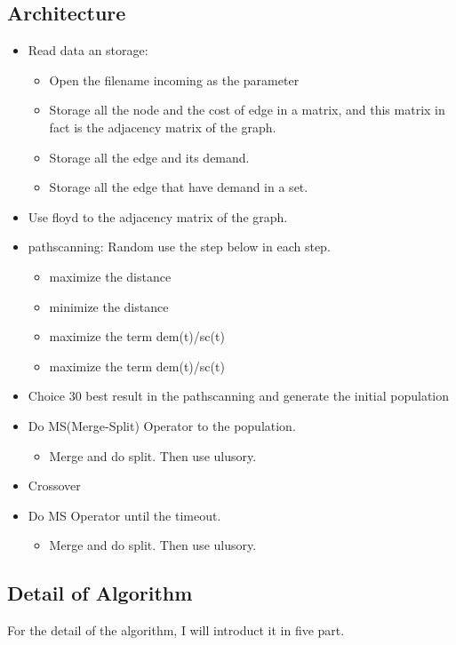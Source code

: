 \documentclass[conference,compsoc]{IEEEtran}
\begin{document}
  \subsection{Architecture}
    \begin{itemize}
      \item Read data an storage:
        \begin{itemize}
          \item Open the filename incoming as the parameter
          \item Storage all the node and the cost of edge in a matrix, and this matrix in fact is the adjacency matrix of the graph.
          \item Storage all the edge and its demand.
          \item Storage all the edge that have demand in a set.
        \end{itemize}
      \item Use floyd to the adjacency matrix of the graph.
      \item pathscanning: 
      Random use the step below in each step.
        \begin{itemize}
          \item maximize the distance
          \item minimize the distance 
          \item maximize the term dem(t)/sc(t)
          \item maximize the term dem(t)/sc(t)
        \end{itemize}
      \item Choice 30 best result in the pathscanning and generate the initial population
      \item Do MS(Merge-Split) Operator to the population.
        \begin{itemize}
          \item Merge and do split. Then use ulusory.
        \end{itemize}
      \item Crossover
      \item Do MS Operator until the timeout.
        \begin{itemize}
          \item Merge and do split. Then use ulusory.
        \end{itemize}
    \end{itemize}
  \subsection{Detail of Algorithm}
For the detail of the algorithm, I will introduct it in five part.
\end{document}
